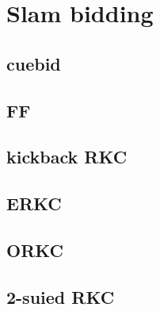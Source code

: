 \section{Slam bidding}

\subsection{cuebid}


\subsection{FF}


\subsection{kickback RKC}


\subsection{ERKC}



\subsection{ORKC}


\subsection{2-suied RKC}

